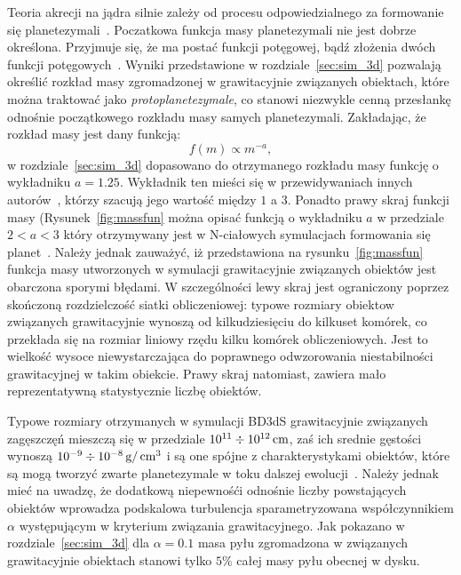 \par Teoria akrecji na jądra silnie zależy od procesu odpowiedzialnego za
formowanie się planetezymali~\cite{HBP13}. Poczatkowa funkcja masy planetezymali
nie jest dobrze określona. Przyjmuje się, że ma postać funkcji potęgowej, bądź
złożenia dwóch funkcji potęgowych~\cite{R03}. Wyniki przedstawione w
rozdziale~\ref{sec:sim_3d} pozwalają określić rozkład masy zgromadzonej w
grawitacyjnie związanych obiektach, które można traktować jako
\emph{protoplanetezymale}, co stanowi niezwykle cenną przesłankę odnośnie
początkowego rozkładu masy samych planetezymali. Zakładając, że rozkład masy
jest dany funkcją:
%
\begin{equation}
   f(m) \propto m^{-a},
\end{equation}
%
w rozdziale~\ref{sec:sim_3d} dopasowano do otrzymanego rozkładu masy funkcję o
wykładniku $a = 1.25$. Wykładnik ten mieści się w przewidywaniach innych
autorów~\cite{R03}, którzy szacują jego wartość między $1$ a $3$. Ponadto prawy
skraj funkcji masy (Rysunek~\ref{fig:massfun} można opisać funkcją o wykładniku
$a$ w przedziale $2 < a < 3$ który otrzymywany jest w N-ciałowych symulacjach
formowania się planet~\cite{MFFK98}.  Należy jednak zauważyć, iż przedstawiona
na rysunku~\ref{fig:massfun} funkcja masy utworzonych w symulacji grawitacyjnie
związanych obiektów jest obarczona sporymi błędami. W szczególności lewy skraj
jest ograniczony poprzez skończoną rozdzielczość siatki obliczeniowej:
typowe rozmiary obiektow związanych grawitacyjnie wynoszą od kilkudziesięciu do
kilkuset komórek, co przekłada się na rozmiar liniowy rzędu kilku komórek
obliczeniowych. Jest to wielkość wysoce niewystarczająca do poprawnego
odwzorowania niestabilności grawitacyjnej w takim obiekcie.
Prawy skraj natomiast, zawiera mało reprezentatywną statystycznie liczbę obiektów.
%
\par Typowe rozmiary otrzymanych w symulacji BD3dS grawitacyjnie związanych
zagęszczęń mieszczą się w przedziale $10^{11} \div 10^{12}\hbox{$\thinspace\textrm{cm}$}$, zaś ich srednie
gęstości wynoszą $10^{-9} \div 10^{-8}\hbox{$\thinspace\textrm{g}$}/\hbox{$\thinspace\textrm{cm}$}^3$ i są one spójne z
charakterystykami obiektów, które są mogą tworzyć zwarte planetezymale w toku
dalszej ewolucji~\cite{HS08}. Należy jednak mieć na uwadzę, że dodatkową
niepewnośći odnośnie liczby powstających obiektów wprowadza podskalowa
turbulencja sparametryzowana współczynnikiem $\alpha$ występującym w kryterium
związania grawitacyjnego. Jak pokazano w
rozdziale~\ref{sec:sim_3d} dla $\alpha = 0.1$ masa pyłu zgromadzona w związanych
grawitacyjnie obiektach stanowi tylko $5\%$ całej masy pyłu obecnej w dysku.
